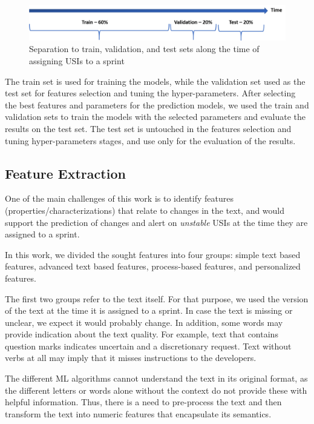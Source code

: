 %


\begin{figure}[ht]
\centering
\includegraphics[width=1.0\textwidth]{Figures/seperation.png}\quad

\caption{Separation to train, validation, and test sets along the time of assigning USIs to a sprint}
\label{fig:train-test-separation}
\end{figure}

The train set is used for training the models, while the validation set used as the test set for features selection and tuning the hyper-parameters. After selecting the best features and parameters for the prediction models, we used the train and validation sets to train the models with the selected parameters and evaluate the results on the test set.
The test set is untouched in the features selection and tuning hyper-parameters stages, and use only for the evaluation of the results.



\subsection{Feature Extraction}
One of the main challenges of this work is to identify features (properties/characterizations) that relate to changes in the text, and would support the prediction of changes and alert on \emph{unstable} USIs at the time they are assigned to a sprint. 

In this work, we divided the sought features into four groups: simple text based features, advanced text based features, process-based features, and personalized features.

The first two groups refer to the text itself. For that purpose, we used the version of the text at the time it is assigned to a sprint. In case the text is missing or unclear, we expect it would probably change. In addition, some words may provide indication about the text quality. For example, text that contains question marks indicates uncertain and a discretionary request. Text without verbs at all may imply that it misses instructions to the developers. 

The different ML algorithms cannot understand the text in its original format, as the different letters or words alone without the context do not provide these with helpful information. Thus, there is a need to pre-process the text and then transform the text into numeric features that encapsulate its semantics. 

